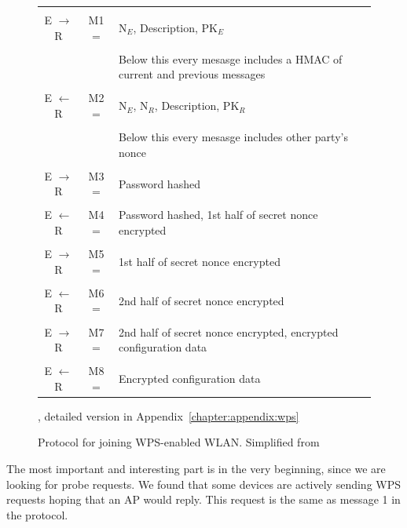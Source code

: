 \documentclass[12pt,a4paper,oneside,pdftex]{report}
\begin{document}
\begin{figure}
\label{tab:wps}
\begin{tabular}{c|c p{10cm}}
    \hline \\

    E $\rightarrow$ R & M1 = & N$_E$, Description, PK$_E$ \\\\

    &  & Below this every mesasge includes a HMAC of current and previous messages \\
    \hline \\

    E $\leftarrow$ R & M2 = & N$_E$, N$_R$, Description, PK$_R$ \\\\

    &  & Below this every mesasge includes other party's nonce \\
    \hline \\

    E $\rightarrow$ R & M3 = & Password hashed \\\\

    E $\leftarrow$ R & M4 = & Password hashed, 1st half of secret nonce encrypted \\\\

    E $\rightarrow$ R & M5 = & 1st half of secret nonce encrypted \\\\

    E $\leftarrow$ R & M6 = & 2nd half of secret nonce encrypted \\\\

    E $\rightarrow$ R & M7 = & 2nd half of secret nonce encrypted, encrypted configuration data \\\\

    E $\leftarrow$ R & M8 = & Encrypted configuration data \\
    \hline
\end{tabular}
\caption{Protocol for joining WPS-enabled WLAN. Simplified from~\cite{microsoftWCN}}, detailed version in Appendix~\ref{chapter:appendix:wps}
\end{figure}

The most important and interesting part is in the very beginning, since we are looking for probe requests. We found that some devices are actively sending WPS requests hoping that an AP would reply. This request is the same as message 1 in the protocol.
\end{document}
